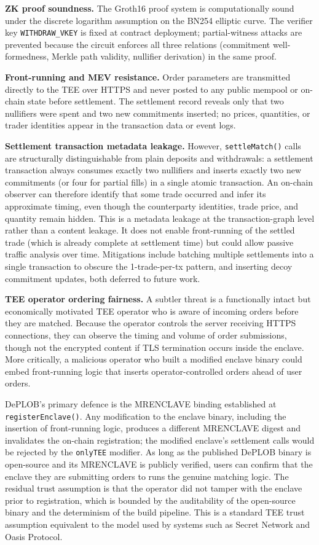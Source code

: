 \documentclass[12pt,a4paper]{article}
\begin{document}
\textbf{ZK proof soundness.} The Groth16 proof system is computationally sound under the discrete logarithm assumption on the BN254 elliptic curve. The verifier key \texttt{WITHDRAW\_VKEY} is fixed at contract deployment; partial-witness attacks are prevented because the circuit enforces all three relations (commitment well-formedness, Merkle path validity, nullifier derivation) in the same proof.

\textbf{Front-running and MEV resistance.} Order parameters are transmitted directly to the TEE over HTTPS and never posted to any public mempool or on-chain state before settlement. The settlement record reveals only that two nullifiers were spent and two new commitments inserted; no prices, quantities, or trader identities appear in the transaction data or event logs.

\textbf{Settlement transaction metadata leakage.} However, \texttt{settleMatch()} calls are structurally distinguishable from plain deposits and withdrawals: a settlement transaction always consumes exactly two nullifiers and inserts exactly two new commitments (or four for partial fills) in a single atomic transaction. An on-chain observer can therefore identify that some trade occurred and infer its approximate timing, even though the counterparty identities, trade price, and quantity remain hidden. This is a metadata leakage at the transaction-graph level rather than a content leakage. It does not enable front-running of the settled trade (which is already complete at settlement time) but could allow passive traffic analysis over time. Mitigations include batching multiple settlements into a single transaction to obscure the 1-trade-per-tx pattern, and inserting decoy commitment updates, both deferred to future work.

\textbf{TEE operator ordering fairness.} A subtler threat is a functionally intact but economically motivated TEE operator who is aware of incoming orders before they are matched. Because the operator controls the server receiving HTTPS connections, they can observe the timing and volume of order submissions, though not the encrypted content if TLS termination occurs inside the enclave. More critically, a malicious operator who built a modified enclave binary could embed front-running logic that inserts operator-controlled orders ahead of user orders.

DePLOB's primary defence is the MRENCLAVE binding established at \texttt{registerEnclave()}. Any modification to the enclave binary, including the insertion of front-running logic, produces a different MRENCLAVE digest and invalidates the on-chain registration; the modified enclave's settlement calls would be rejected by the \texttt{onlyTEE} modifier. As long as the published DePLOB binary is open-source and its MRENCLAVE is publicly verified, users can confirm that the enclave they are submitting orders to runs the genuine matching logic. The residual trust assumption is that the operator did not tamper with the enclave prior to registration, which is bounded by the auditability of the open-source binary and the determinism of the build pipeline. This is a standard TEE trust assumption equivalent to the model used by systems such as Secret Network and Oasis Protocol.
\end{document}
